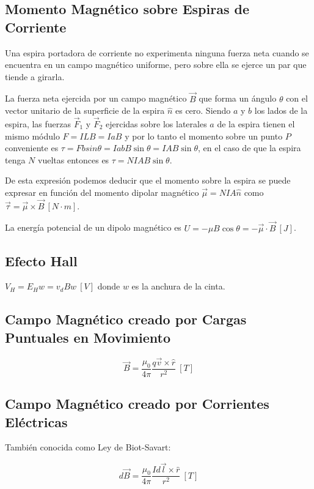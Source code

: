 \documentclass{tufte-handout}
\begin{document}
\subsection{Momento Magnético sobre Espiras de Corriente}

Una espira portadora de corriente no experimenta ninguna fuerza neta cuando se encuentra en un campo magnético uniforme, pero sobre ella se ejerce un par que tiende a girarla.

La fuerza neta ejercida por un campo magnético $\vec{B}$ que forma un ángulo $\theta$ con el vector unitario de la superficie de la espira $\hat{n}$ es cero. Siendo $a$ y $b$ los lados de la espira, las fuerzas $\vec{F}_1$ y $\vec{F}_2$ ejercidas sobre los laterales $a$ de la espira tienen el mismo módulo $F = ILB = IaB$ y por lo tanto el momento sobre un punto $P$ conveniente es $\tau = Fbsin\theta = IabB\sin{\theta} = IAB\sin{\theta}$, en el caso de que la espira tenga $N$ vueltas entonces es $\tau = NIAB\sin{\theta}$.

De esta expresión podemos deducir que el momento sobre la espira se puede expresar en función del momento dipolar magnético $\vec{\mu} = NIA\hat{n}$ como $\vec{\tau} = \vec{\mu}\times\vec{B}~[N\cdot m]$.

La energía potencial de un dipolo magnético es $U = -\mu B\cos{\theta} = -\vec{\mu}\cdot\vec{B}~[J]$.

\subsection{Efecto Hall}

$V_H = E_Hw = v_dBw~[V]$ donde $w$ es la anchura de la cinta.

\subsection{Campo Magnético creado por Cargas Puntuales en Movimiento}

\begin{equation}
\vec{B} = \frac{\mu_0}{4\pi}\frac{q\vec{v}\times\hat{r}}{r^2}~[T]
\end{equation}

\subsection{Campo Magnético creado por Corrientes Eléctricas}

También conocida como Ley de Biot-Savart:

\begin{equation}
d\vec{B} = \frac{\mu_0}{4\pi}\frac{Id\vec{l}\times\hat{r}}{r^2}~[T]
\end{equation}
\end{document}
